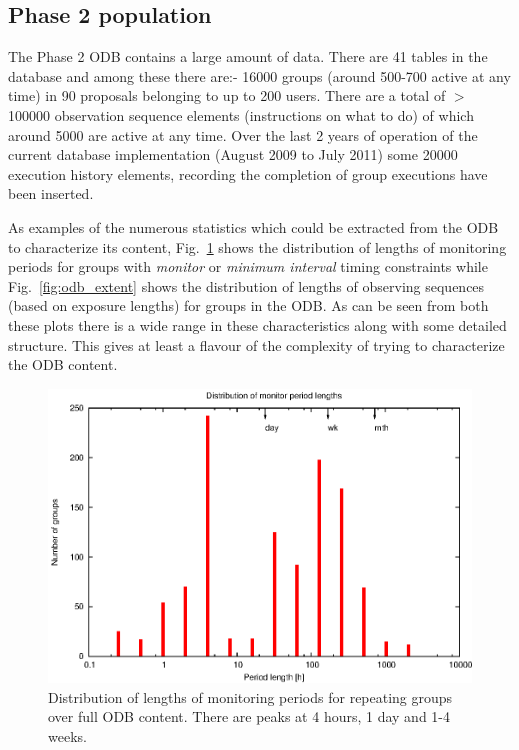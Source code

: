 {{\subsection{Phase 2 population}

The Phase 2 ODB contains a large amount of data. There are 41 tables in the database and among these there are:- 16000 groups (around 500-700 active at any time) in 90 proposals belonging to up to 200 users. There are a total of $>$ 100000 observation sequence elements (instructions on what to do) of which around 5000 are active at any time.  Over the last 2 years of operation  of the current database implementation (August 2009 to July 2011) some 20000 execution history elements, recording the completion of group executions have been inserted. 

As examples of the numerous statistics which could be extracted from the ODB to characterize its content,  Fig.~\ref{fig:odb_period} shows the distribution of lengths of monitoring periods for groups with \emph{monitor} or \emph{minimum interval} timing constraints while Fig.~\ref{fig:odb_extent} shows the distribution of lengths of observing sequences (based on exposure lengths) for groups in the ODB. As can be seen from both these plots there is a wide range in these characteristics along with some detailed structure. This gives at least a flavour of the complexity of trying to characterize the ODB content.

\begin{figure}[htbp]
\begin{center}
    \includegraphics[scale=1.0, angle=0]{figures/per.eps}
\end{center} 
\caption[Distribution of lengths of monitoring periods for repeating groups over full ODB content.]
{Distribution of lengths of monitoring periods for repeating groups over full ODB content. There are peaks at 4 hours, 1 day and 1-4 weeks.}
\label{fig:odb_period}
\end{figure}

}}
